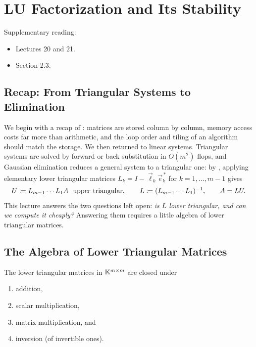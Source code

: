 \chapter{LU Factorization and Its Stability}
\label{ch:lu}

Supplementary reading:
\begin{itemize}
  \item \cite{TB} Lectures 20 and 21.
  \item \cite{Demmel} Section 2.3.
\end{itemize}

\section{Recap: From Triangular Systems to Elimination}

We begin with a recap of : matrices are stored column by column, memory access costs far more than arithmetic, and the loop order and tiling of an algorithm should match the storage. We then returned to linear systems. Triangular systems are solved by forward or back substitution in $O(m^2)$ flops, and Gaussian elimination reduces a general system to a triangular one: by , applying elementary lower triangular matrices $L_k = I - \vec{\ell}_k\vec{e}_k^{\,\ast}$ for $k = 1, \dots, m - 1$ gives
\begin{equation}
  U \defeq L_{m-1} \cdots L_1 A \ \text{ upper triangular}, \qquad L \defeq (L_{m-1} \cdots L_1)^{-1}, \qquad A = LU.
\end{equation}
This lecture answers the two questions left open: \emph{is $L$ lower triangular, and can we compute it cheaply?} Answering them requires a little algebra of lower triangular matrices.

\section{The Algebra of Lower Triangular Matrices}

\begin{proposition}
  \label{prop:lower-closure}
  The lower triangular matrices in $\mathbb{K}^{m \times m}$ are closed under
  \begin{enumerate}
    \item addition,
    \item scalar multiplication,
    \item matrix multiplication, and
    \item inversion (of invertible ones).
  \end{enumerate}
\end{proposition}

